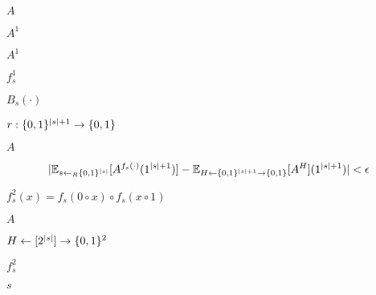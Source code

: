 \documentclass[10pt]{book}
\begin{document}
\begin{mdSnippets}
\begin{mdInlineSnippet}[7fc56270e7a70fa81a5935b72eacbe29]
$A$\end{mdInlineSnippet}%
\begin{mdInlineSnippet}%
$A^1$\end{mdInlineSnippet}%
\begin{mdInlineSnippet}%
$A^1$\end{mdInlineSnippet}%
\begin{mdInlineSnippet}[aa562ba5b23308d9d18c51736def9fb4]%
$f^1_s$\end{mdInlineSnippet}%
\begin{mdInlineSnippet}[845fe607884452a94e0eb68e732c447b]%
$B_s(\cdot)$\end{mdInlineSnippet}%
\begin{mdInlineSnippet}[3359af6b4ee9cb43ee0790e065d0e314]%
$r: \{0,1\}^{|s|+1} \to \{0,1\}$\end{mdInlineSnippet}%
\begin{mdInlineSnippet}[7fc56270e7a70fa81a5935b72eacbe29]%
$A$\end{mdInlineSnippet}%
\begin{mdDisplaySnippet}[0ceedf0f5153fd7bf0e9cc2b1ef93639]%
\[%
|\E_{s \gets_R \zo^{|s|}} [A^{f_s(\cdot)}(1^{|s|+1})] - \E_{H \gets \zo^{|s|+1} \to \zo}[A^{H}](1^{|s|+1}) | < \epsilon
\]%
\end{mdDisplaySnippet}%
\begin{mdInlineSnippet}%
$f^2_s(x)=f_s(0\circ x) \circ f_s(x\circ 1)$\end{mdInlineSnippet}%
\begin{mdInlineSnippet}[7fc56270e7a70fa81a5935b72eacbe29]%
$A$\end{mdInlineSnippet}%
\begin{mdInlineSnippet}[79667df04ae42e44831c2f3533310285]%
$H \gets [2^{|s|}] \to \{0,1\}^2$\end{mdInlineSnippet}%
\begin{mdInlineSnippet}[a35f6f67787cf68ad85ce8181265609f]%
$f^2_s$\end{mdInlineSnippet}%
\begin{mdInlineSnippet}[03c7c0ace395d80182db07ae2c30f034]%
$s$\end{mdInlineSnippet}%

\end{mdSnippets}
\end{document}
